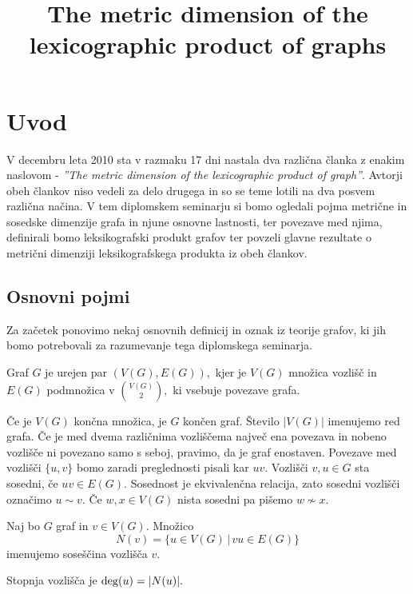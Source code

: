 \documentclass[mat1, tisk]{fmfdelo}
\title{The metric dimension of the lexicographic product of graphs}
\newcommand{\1}{(1, 1, ..., 1)}
\newcommand{\2}{(2, 2, ..., 2)}
\begin{document}
\section{Uvod}
V decembru leta 2010 sta v razmaku 17 dni nastala dva različna članka z enakim naslovom - 
\textit{''The metric dimension of the lexicographic product of graph''}. Avtorji obeh člankov 
niso vedeli za delo drugega in so se teme lotili na dva posvem različna načina. V tem diplomskem 
seminarju si bomo ogledali pojma metrične in sosedske dimenzije grafa in njune osnovne lastnosti, 
ter povezave med njima, definirali bomo leksikografski produkt grafov ter povzeli 
glavne rezultate o metrični dimenziji leksikografskega produkta iz obeh člankov.




\subsection{Osnovni pojmi} \label{ss:osnovni_pojmi}
Za začetek ponovimo nekaj osnovnih definicij in oznak iz teorije grafov, ki jih bomo potrebovali 
za razumevanje tega diplomskega seminarja. 

\begin{definicija} \label{def:graf}
    Graf $G$ je urejen par $(V(G), E(G)),$ kjer je $V(G)$ množica vozlišč in $E(G)$ 
    podmnožica v $\binom{V(G)}{2},$ ki vsebuje povezave grafa.
\end{definicija}

Če je $V(G)$ končna množica, je $G$ končen graf. Število $|V(G)|$ imenujemo red grafa. 
Če je med dvema različnima vozliščema največ ena povezava in nobeno vozlišče ni povezano samo 
s seboj, pravimo, da je graf enostaven. Povezave med vozlišči $\{u, v\}$ bomo zaradi preglednosti
pisali kar $uv$. Vozlišči $v, u \in G$ sta sosedni, če $uv \in E(G).$ 
Sosednost je ekvivalenčna relacija, zato sosedni vozlišči označimo $u \sim v.$ Če $w, x \in V(G)$ 
nista sosedni pa pišemo $w \not \sim x.$

\begin{definicija} \label{def:sosescina}
    Naj bo $G$ graf in $v \in V(G)$. Množico 
    $$N(v) = \{u \in V(G) \, | \,vu \in E(G) \}$$ imenujemo soseščina vozlišča $v$.

    Stopnja vozlišča je ${\rm deg}(u) = |N(u)|.$
\end{definicija}
\end{document}
